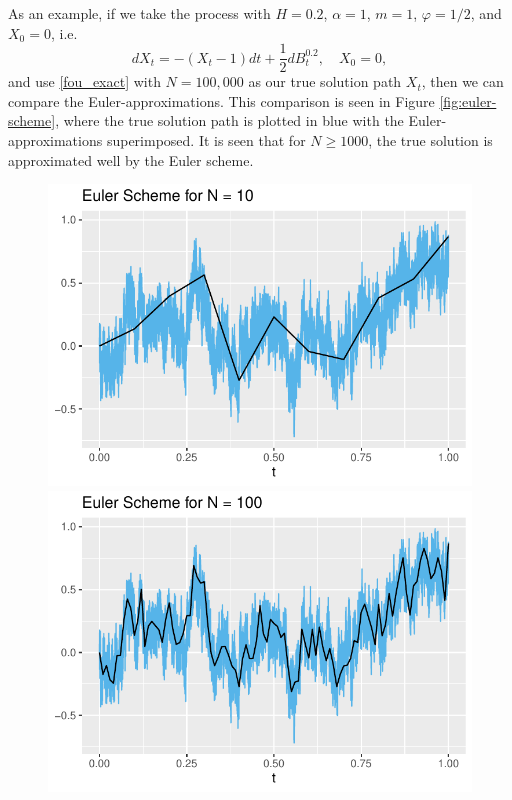 As an example, if we take the process with $H=0.2$, $\alpha = 1$, $m=1$, $\varphi=1/2$, and $X_{0}=0$, i.e.
\begin{equation}
    dX_{t}=-(X_{t}-1)dt+\frac{1}{2}dB^{0.2}_{t},\quad X_{0}=0,
\end{equation}
and use \eqref{fou_exact} with $N=100,000$ as our true solution path $X_{t}$, then we can compare the Euler-approximations. This comparison is seen in Figure \ref{fig:euler-scheme}, where the true solution path is plotted in blue with the Euler-approximations superimposed. It is seen that for $N\geq 1000$, the true solution is approximated well by the Euler scheme.
\begin{figure}[H]
    \centering
    \includegraphics[scale=0.52]{fig/img/EulerScheme/EulerScheme10.pdf}
    \includegraphics[scale=0.52]{fig/img/EulerScheme/EulerScheme100.pdf}

\end{figure}
